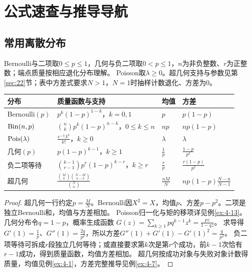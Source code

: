 \chapter{公式速查与推导导航}\label{app:formula}
\section{常用离散分布}
Bernoulli与二项取$0\le p\le1$，几何与负二项取$0<p\le1$，$n$为非负整数、$r$为正整数；端点质量按相应退化分布理解。
Poisson取$\lambda\ge0$。超几何支持与参数见第\ref{sec:22}节；表中方差式要求$N>1$，$N=1$时抽样计数退化、方差为0。
\small
\begin{longtable}{@{}p{}p{}p{}p{}@{}}\toprule
分布&质量函数与支持&均值&方差\\\midrule\endhead
Bernoulli$(p)$&$p^k(1-p)^{1-k}$，$k=0,1$&$p$&$p(1-p)$\\
$\operatorname{Bin}(n,p)$&$\binom nkp^k(1-p)^{n-k}$，$0\le k\le n$&$np$&$np(1-p)$\\
$\operatorname{Pois}(\lambda)$&$\frac{e^{-\lambda}\lambda^k}{k!}$，$k\ge0$&$\lambda$&$\lambda$\\
几何$(p)$&$p(1-p)^{k-1}$，$k\ge1$&$\frac{1}{p}$&$\frac{1-p}{p^2}$\\
负二项等待&$\binom{k-1}{r-1}p^r(1-p)^{k-r}$，$k\ge r$&$\frac{r}{p}$&$\frac{r(1-p)}{p^2}$\\
超几何&$\frac{\binom Mk\binom{N-M}{n-k}}{\binom Nn}$&$\frac{nM}{N}$&$np(1-p)\frac{N-n}{N-1}$\\\bottomrule
\end{longtable}\normalsize
\begin{proof}
超几何一行约定$p=\frac{M}{N}$。Bernoulli因$X^2=X$，均值$p$、方差$p-p^2$。二项是独立Bernoulli和，均值与方差相加。
Poisson归一化与矩的移项详见例\ref{ex:4-13}。
几何分布令$q=1-p$，概率生成函数
$G(z)=\sum_{k\ge1}pq^{k-1}z^k=\frac{pz}{1-qz}$。
求导得$G'(1)=\frac{1}{p}$、$G''(1)=\frac{2q}{p^2}$，所以方差$G''(1)+G'(1)-G'(1)^2=\frac{q}{p^2}$。
负二项等待可拆成$r$段独立几何等待；或直接要求第$k$次是第$r$个成功，前$k-1$次恰有$r-1$成功，得到质量函数，均值方差相加。
超几何按成功对象与失败对象计数得质量，均值见例\ref{ex:4-1}，方差完整推导见例\ref{ex:4-7}。
\end{proof}

